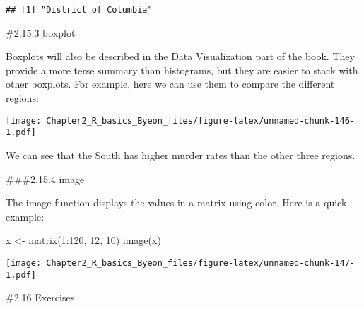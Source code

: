 \documentclass[
]{article}
\newenvironment{Shaded}{\begin{snugshade}}{\end{snugshade}}
\newcommand{\AttributeTok}[1]{\textcolor[rgb]{0.77,0.63,0.00}{#1}}
\newcommand{\DecValTok}[1]{\textcolor[rgb]{0.00,0.00,0.81}{#1}}
\newcommand{\FunctionTok}[1]{\textcolor[rgb]{0.00,0.00,0.00}{#1}}
\newcommand{\NormalTok}[1]{#1}
\newcommand{\OtherTok}[1]{\textcolor[rgb]{0.56,0.35,0.01}{#1}}
\newcommand{\SpecialCharTok}[1]{\textcolor[rgb]{0.00,0.00,0.00}{#1}}
\begin{document}
\begin{Shaded}
\end{Shaded}

\begin{verbatim}
## [1] "District of Columbia"
\end{verbatim}

\#2.15.3 boxplot

Boxplots will also be described in the Data Visualization part of the
book. They provide a more terse summary than histograms, but they are
easier to stack with other boxplots. For example, here we can use them
to compare the different regions:

\begin{Shaded}
\end{Shaded}

\texttt{[image: Chapter2\_R\_basics\_Byeon\_files/figure-latex/unnamed-chunk-146-1.pdf]}

We can see that the South has higher murder rates than the other three
regions.

\#\#\#2.15.4 image

The image function displays the values in a matrix using color. Here is
a quick example:

\begin{Shaded}
\begin{Highlighting}[]
\NormalTok{x }\OtherTok{\textless{}{-}} \FunctionTok{matrix}\NormalTok{(}\DecValTok{1}\SpecialCharTok{:}\DecValTok{120}\NormalTok{, }\DecValTok{12}\NormalTok{, }\DecValTok{10}\NormalTok{)}
\FunctionTok{image}\NormalTok{(x)}
\end{Highlighting}
\end{Shaded}

\texttt{[image: Chapter2\_R\_basics\_Byeon\_files/figure-latex/unnamed-chunk-147-1.pdf]}

\#2.16 Exercises
\end{document}
